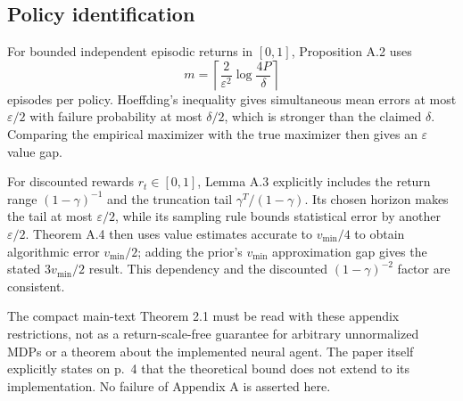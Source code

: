 \documentclass[10pt]{article}
\begin{document}
\subsection*{Policy identification}
For bounded independent episodic returns in \([0,1]\), Proposition A.2 uses \[m=\left\lceil\frac{2}{\varepsilon^2}
                   \log\frac{4P}{\delta}\right\rceil\] episodes per policy. Hoeffding’s inequality gives simultaneous mean errors at most \(\varepsilon/2\) with failure probability at most \(\delta/2\), which is stronger than the claimed \(\delta\). Comparing the empirical maximizer with the true maximizer then gives an \(\varepsilon\) value gap.\par
For discounted rewards \(r_t\in[0,1]\), Lemma A.3 explicitly includes the return range \((1-\gamma)^{-1}\) and the truncation tail \(\gamma^T/(1-\gamma)\). Its chosen horizon makes the tail at most \(\varepsilon/2\), while its sampling rule bounds statistical error by another \(\varepsilon/2\). Theorem A.4 then uses value estimates accurate to \(v_{\min}/4\) to obtain algorithmic error \(v_{\min}/2\); adding the prior’s \(v_{\min}\) approximation gap gives the stated \(3v_{\min}/2\) result. This dependency and the discounted \((1-\gamma)^{-2}\) factor are consistent.\par
The compact main-text Theorem 2.1 must be read with these appendix restrictions, not as a return-scale-free guarantee for arbitrary unnormalized MDPs or a theorem about the implemented neural agent. The paper itself explicitly states on p. 4 that the theoretical bound does not extend to its implementation. No failure of Appendix A is asserted here.\par
\end{document}
